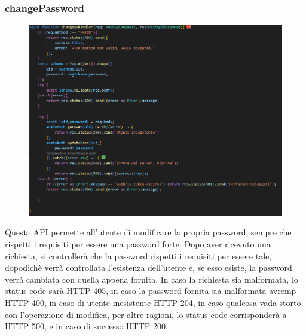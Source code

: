 \documentclass[11pt, a4paper]{article}
\theoremstyle{definition}
\begin{document}
\subsubsection{changePassword}
\begin{figure}[H]
  \centering
  \includegraphics[width=\textwidth]{materiale/API/ChangePassword.png}  
\end{figure}
Questa API permette all'utente di modificare la propria password, sempre che rispetti i requisiti per essere una password forte.
Dopo aver ricevuto una richiesta, si controllerà che la password rispetti i requisiti per essere tale, dopodichè verrà controllata l'esistenza
dell'utente e, se esso esiste, la password verrà cambiata con quella appena fornita.
In caso la richiesta sia malformata, lo status code sarà HTTP 405, in caso la password fornita sia malformata avremp HTTP 400, in caso di utente inesistente HTTP 204,
in caso qualcosa vada storto con l'operazione di modifica, per altre ragioni,
lo status code corrisponderà a HTTP 500, e in caso di successo HTTP 200.
\end{document}

